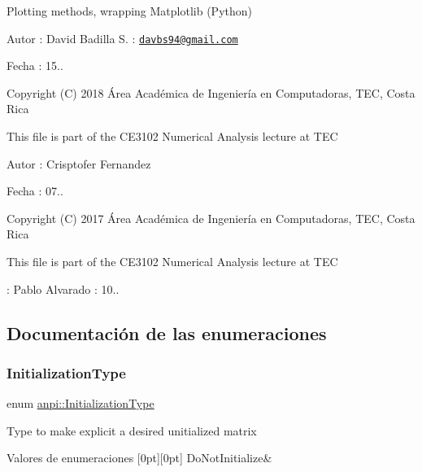 Plotting methods, wrapping Matplotlib (Python) \begin{DoxyAuthor}{Autor}
\+: David Badilla S. \+: \href{mailto:davbs94@gmail.com}{\tt davbs94@gmail.\+com} 
\end{DoxyAuthor}
\begin{DoxyDate}{Fecha}
\+: 15..
\end{DoxyDate}
Copyright (C) 2018 Área Académica de Ingeniería en Computadoras, T\+EC, Costa Rica

This file is part of the C\+E3102 Numerical Analysis lecture at T\+EC

\begin{DoxyAuthor}{Autor}
\+: Crisptofer Fernandez 
\end{DoxyAuthor}
\begin{DoxyDate}{Fecha}
\+: 07..
\end{DoxyDate}
Copyright (C) 2017 Área Académica de Ingeniería en Computadoras, T\+EC, Costa Rica

This file is part of the C\+E3102 Numerical Analysis lecture at T\+EC

\+: Pablo Alvarado  \+: 10.. 

\subsection{Documentación de las enumeraciones}
\mbox{\label{namespaceanpi_a57664960c64a6275e3bf1c70d6fab177}} 
\subsubsection{\texorpdfstring{Initialization\+Type}{InitializationType}}
{\footnotesize\ttfamily enum \hyperlink{namespaceanpi_a57664960c64a6275e3bf1c70d6fab177}{anpi\+::\+Initialization\+Type}}

Type to make explicit a desired unitialized matrix \begin{DoxyEnumFields}{Valores de enumeraciones}
[0pt][0pt]{}\mbox{\label{namespaceanpi_a57664960c64a6275e3bf1c70d6fab177ae52a283781be1305088afb0aeb8c8d9a}} 
Do\+Not\+Initialize&\\
\hline

\end{DoxyEnumFields}



